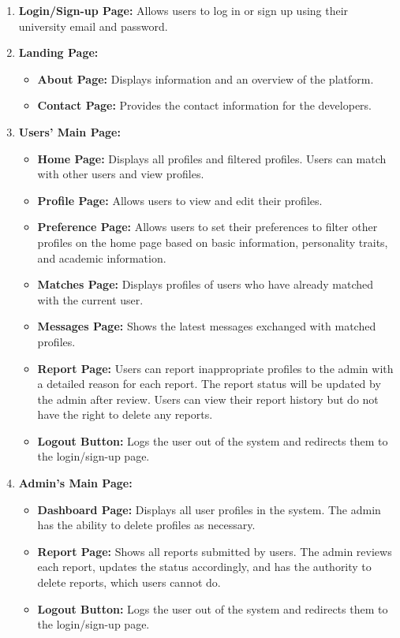 \begin{enumerate}
        \newpage
        \item \textbf{Login/Sign-up Page:} Allows users to log in or sign up using their university email and password.
        
        \item \textbf{Landing Page:} 
        \begin{itemize}
            \item \textbf{About Page:} Displays information and an overview of the platform.
            \item \textbf{Contact Page:} Provides the contact information for the developers.
        \end{itemize}
        
        \item \textbf{Users’ Main Page:}
        \begin{itemize}
            \item \textbf{Home Page:} Displays all profiles and filtered profiles. Users can match with other users and view profiles.
            \item \textbf{Profile Page:} Allows users to view and edit their profiles.
            \item \textbf{Preference Page:} Allows users to set their preferences to filter other profiles on the home page based on basic information, personality traits, and academic information.
            \item \textbf{Matches Page:} Displays profiles of users who have already matched with the current user.
            \item \textbf{Messages Page:} Shows the latest messages exchanged with matched profiles.
            \item \textbf{Report Page:} Users can report inappropriate profiles to the admin with a detailed reason for each report. The report status will be updated by the admin after review. Users can view their report history but do not have the right to delete any reports.
            \item \textbf{Logout Button:} Logs the user out of the system and redirects them to the login/sign-up page.
        \end{itemize}

        \item \textbf{Admin’s Main Page:}
        \begin{itemize}
            \item \textbf{Dashboard Page:} Displays all user profiles in the system. The admin has the ability to delete profiles as necessary.
            \item \textbf{Report Page:} Shows all reports submitted by users. The admin reviews each report, updates the status accordingly, and has the authority to delete reports, which users cannot do.
            \item \textbf{Logout Button:} Logs the user out of the system and redirects them to the login/sign-up page.
        \end{itemize}
    \end{enumerate}
    \newpage
